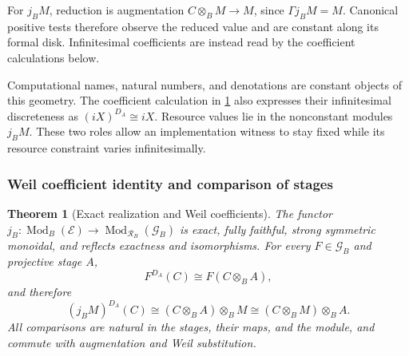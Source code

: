 \documentclass[11pt,a4paper]{article}
\numberwithin{algorithm}{section}
\numberwithin{equation}{section}
\newtheorem{theorem}{Theorem}[section]
\theoremstyle{definition}
\theoremstyle{remark}
\theoremstyle{plain}
\newcommand{\E}{\mathcal E}
\newcommand{\Mod}{\operatorname{Mod}}
\newcommand{\Geo}{\mathcal G_B}
\newcommand{\Rline}{\mathcal R_B}
\theoremstyle{definition}
\theoremstyle{plain}
\begin{document}
For $j_BM$, reduction is augmentation
$C\otimes_BM\to M$, since $\Gamma j_BM=M$.
Canonical positive tests therefore observe the reduced value and
are constant along its formal disk. Infinitesimal coefficients
are instead read by the coefficient calculations below.


Computational names, natural numbers, and denotations are constant
objects of this geometry. The coefficient calculation in
\cref{thm:weil} also expresses their infinitesimal discreteness as
$(iX)^{D_A}\cong iX$. Resource values lie in the nonconstant modules
$j_BM$. These two roles allow an implementation witness to stay
fixed while its resource constraint varies infinitesimally.

\subsubsection{Weil coefficient identity and comparison of stages}
\begin{theorem}[Exact realization and Weil coefficients]
\label{thm:weil}
The functor $j_B:\Mod_B(\E)\to\Mod_{\Rline}(\Geo)$ is exact,
fully faithful, strong symmetric monoidal, and reflects exactness
and isomorphisms.  For every $F\in\Geo$ and projective stage $A$,
\[
 F^{D_A}(C)\cong F(C\otimes_BA),
\]
and therefore
\begin{equation}\label{eq:weil-coefficients}
 (j_BM)^{D_A}(C)
 \cong (C\otimes_BA)\otimes_BM
 \cong (C\otimes_BM)\otimes_BA.
\end{equation}
All comparisons are natural in the stages, their maps, and the
module, and commute with augmentation and Weil substitution.
\end{theorem}
\end{document}
